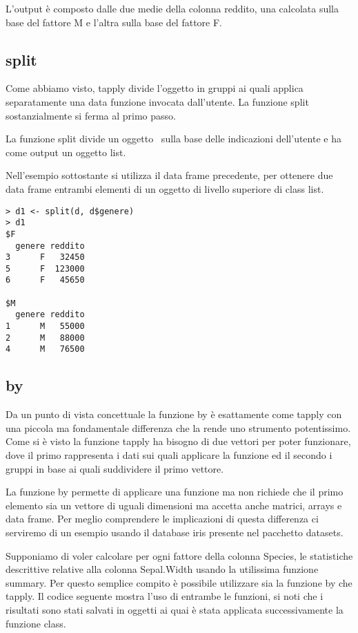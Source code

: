 L'output è composto dalle due medie della colonna reddito, una calcolata sulla base del fattore M e l'altra sulla base del fattore F.

\subsection{split}

Come abbiamo visto, \textsf{tapply} divide l'oggetto in gruppi ai quali applica separatamente una data funzione invocata dall'utente. La funzione \textsf{split} sostanzialmente si ferma al primo passo.

La funzione \textsf{split} divide un oggetto \erre\ sulla base delle indicazioni dell'utente e ha come output un oggetto list.

Nell'esempio sottostante si utilizza il data frame precedente, per ottenere due data frame entrambi elementi di un oggetto di livello superiore di class list.

\begin{lstlisting}	
> d1 <- split(d, d$genere)
> d1
$F
  genere reddito
3      F   32450
5      F  123000
6      F   45650

$M
  genere reddito
1      M   55000
2      M   88000
4      M   76500
\end{lstlisting}

\subsection{by}

Da un punto di vista concettuale la funzione \textsf{by} è esattamente come \textsf{tapply} con una piccola ma fondamentale differenza che la rende uno strumento potentissimo. Come si è visto la funzione \textsf{tapply} ha bisogno di due vettori per poter funzionare, dove il primo rappresenta i dati sui quali applicare la funzione ed il secondo i gruppi in base ai quali suddividere il primo vettore.

La funzione \textsf{by} permette di applicare una funzione ma non richiede che il primo elemento sia un vettore di uguali dimensioni ma accetta anche matrici, arrays e data frame. Per meglio comprendere le implicazioni di questa differenza ci serviremo di un esempio usando il database iris presente nel pacchetto \textsf{datasets}.

Supponiamo di voler calcolare per ogni fattore della colonna Species, le statistiche descrittive relative alla colonna Sepal.Width usando la utilissima funzione \textsf{summary}. Per questo semplice compito è possibile utilizzare sia la funzione \textsf{by} che \textsf{tapply}. Il codice seguente mostra l'uso di entrambe le funzioni, si noti che i risultati sono stati salvati in oggetti ai quai è stata applicata successivamente la funzione \textsf{class}. 

